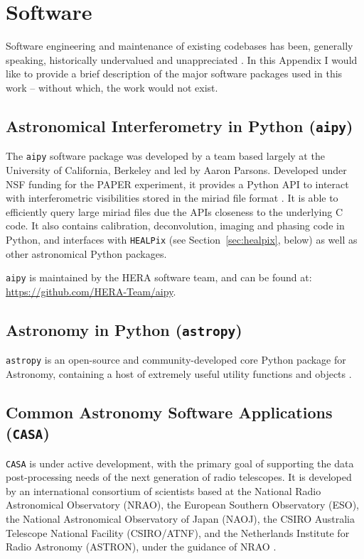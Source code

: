 \chapter{Software}

Software engineering and maintenance of existing codebases has been, generally speaking, historically undervalued and unappreciated \citep{AstropyProblem}. In this Appendix I would like to provide a brief description of the major software packages used in this work -- without which, the work would not exist.

\section{Astronomical Interferometry in Python ({\tt aipy})}
\label{sec:aipy}

The {\tt aipy} software package \citep{aipy} was developed by a team based largely at the University of California, Berkeley and led by Aaron Parsons. Developed under NSF funding for the PAPER experiment, it provides a Python API to interact with interferometric visibilities stored in the {\sc miriad} file format \citep{miriad}. It is able to efficiently query large {\sc miriad} files due the APIs closeness to the underlying C code. It also contains calibration, deconvolution, imaging and phasing code in Python, and interfaces with {\tt HEALPix} (see Section~\ref{sec:healpix}, below) as well as other astronomical Python packages.

{\tt aipy} is maintained by the HERA software team, and can be found at: \url{https://github.com/HERA-Team/aipy}.

\section{Astronomy in Python ({\tt astropy})}

{\tt astropy} is an open-source and community-developed core Python package for Astronomy, containing a host of extremely useful utility functions and objects \citep{astropy}.

\section{Common Astronomy Software Applications ({\tt CASA})}
\label{sec:casa}

{\tt CASA} is under active development, with the primary goal of supporting the data post-processing needs of the next generation of radio telescopes. It is developed by an international consortium of scientists based at the National Radio Astronomical Observatory (NRAO), the European Southern Observatory (ESO), the National Astronomical Observatory of Japan (NAOJ), the CSIRO Australia Telescope National Facility (CSIRO/ATNF), and the Netherlands Institute for Radio Astronomy (ASTRON), under the guidance of NRAO \citep{casa}.

